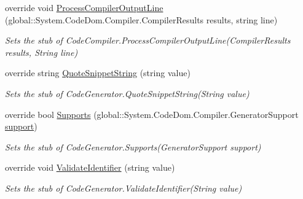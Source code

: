 \begin{DoxyCompactItemize}
override void \hyperlink{class_system_1_1_code_dom_1_1_compiler_1_1_fakes_1_1_stub_code_compiler_af29fdb9746e5432f0c923ea6d2adb30b}{Process\-Compiler\-Output\-Line} (global\-::\-System.\-Code\-Dom.\-Compiler.\-Compiler\-Results results, string line)
\begin{DoxyCompactList}\small\item\em Sets the stub of Code\-Compiler.\-Process\-Compiler\-Output\-Line(\-Compiler\-Results results, String line)\end{DoxyCompactList}\item 
override string \hyperlink{class_system_1_1_code_dom_1_1_compiler_1_1_fakes_1_1_stub_code_compiler_a9341c2d3222c1c94057e5b259efc88df}{Quote\-Snippet\-String} (string value)
\begin{DoxyCompactList}\small\item\em Sets the stub of Code\-Generator.\-Quote\-Snippet\-String(\-String value)\end{DoxyCompactList}\item 
override bool \hyperlink{class_system_1_1_code_dom_1_1_compiler_1_1_fakes_1_1_stub_code_compiler_af2704f22c01c920f3f3347fe9417b350}{Supports} (global\-::\-System.\-Code\-Dom.\-Compiler.\-Generator\-Support \hyperlink{jquery-1_810_82-vsdoc_8js_a1be69652377630fc5432ae5ec6463744}{support})
\begin{DoxyCompactList}\small\item\em Sets the stub of Code\-Generator.\-Supports(\-Generator\-Support support)\end{DoxyCompactList}\item 
override void \hyperlink{class_system_1_1_code_dom_1_1_compiler_1_1_fakes_1_1_stub_code_compiler_ac3444f77da429dedd02b8f5f45defe94}{Validate\-Identifier} (string value)
\begin{DoxyCompactList}\small\item\em Sets the stub of Code\-Generator.\-Validate\-Identifier(\-String value)\end{DoxyCompactList}\end{DoxyCompactItemize}
